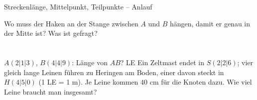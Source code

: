 \setcounter{aufgabe}{0}

\begin{aufgabe}{Streckenlänge, Mittelpunkt, Teilpunkte – Anlauf}
\begin{teile}
\teil Wo muss der Haken an der Stange zwischen $A$ und $B$ hängen, damit er genau in der Mitte ist? Was ist gefragt? \\  \\  \\ 
\teil $A(2 | 1 | 3)$, $B(4 | 4 | 9)$: Länge von $AB$? \leerfeld LE
\teil Ein Zeltmast endet in $S(2 | 2 | 6)$; vier gleich lange Leinen führen zu Heringen am Boden, einer davon steckt in $H(4 | 5 | 0)$ (1 LE = 1 m). Je Leine kommen $40$ cm für die Knoten dazu. Wie viel Leine braucht man insgesamt? \leerfeld[m]
\end{teile}
\end{aufgabe}

